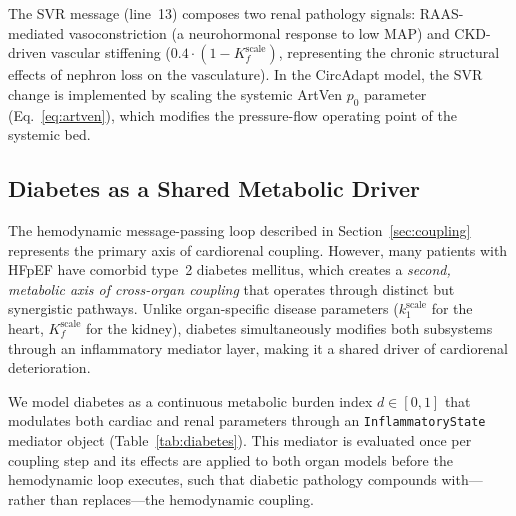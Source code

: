 \documentclass[pmlr]{jmlr}
\begin{document}
The SVR message (line~13) composes two renal pathology signals: RAAS-mediated vasoconstriction (a neurohormonal response to low MAP) and CKD-driven vascular stiffening ($0.4 \cdot (1 - K_f^{\text{scale}})$, representing the chronic structural effects of nephron loss on the vasculature). In the CircAdapt model, the SVR change is implemented by scaling the systemic ArtVen $p_0$ parameter (Eq.~\ref{eq:artven}), which modifies the pressure-flow operating point of the systemic bed.

\subsection{Diabetes as a Shared Metabolic Driver}
\label{sec:diabetes}

The hemodynamic message-passing loop described in Section~\ref{sec:coupling} represents the primary axis of cardiorenal coupling. However, many patients with HFpEF have comorbid type~2 diabetes mellitus, which creates a \emph{second, metabolic axis of cross-organ coupling} that operates through distinct but synergistic pathways. Unlike organ-specific disease parameters ($k_1^{\text{scale}}$ for the heart, $K_f^{\text{scale}}$ for the kidney), diabetes simultaneously modifies both subsystems through an inflammatory mediator layer, making it a shared driver of cardiorenal deterioration.

We model diabetes as a continuous metabolic burden index $d \in [0, 1]$ that modulates both cardiac and renal parameters through an \texttt{InflammatoryState} mediator object (Table~\ref{tab:diabetes}). This mediator is evaluated once per coupling step and its effects are applied to both organ models before the hemodynamic loop executes, such that diabetic pathology compounds with---rather than replaces---the hemodynamic coupling.
\end{document}
